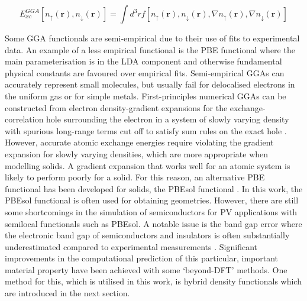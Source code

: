 \documentclass[11pt, twoside]{report}
\begin{document}

\begin{equation}\label{GGA}
E_{xc}^{GGA}[ n_{\uparrow}(\mathbf{r}), n_{\downarrow}(\mathbf{r})] = \int d^3r f [ n_{\uparrow}(\mathbf{r}), n_{\downarrow}(\mathbf{r}), \nabla n_{\uparrow}(\mathbf{r}), \nabla n_{\downarrow}(\mathbf{r})]
\end{equation}

Some GGA functionals are semi-empirical due to their use of fits to experimental data. An example of a less empirical functional is the PBE functional \cite{PBE} where the main parameterisation is in the LDA component and otherwise fundamental physical constants are favoured over empirical fits.
Semi-empirical GGAs can accurately represent small molecules, but usually fail for delocalised electrons in the uniform gas or for simple metals. First-principles numerical GGAs can be constructed from electron density-gradient expansions for the exchange-correlation hole surrounding the electron in a system of slowly varying density with spurious long-range terms cut off to satisfy sum rules on the exact hole \cite{PBE}.
However, accurate atomic exchange energies require violating the gradient expansion for slowly varying densities, which are more appropriate when modelling solids. A gradient expansion that works well for an atomic system is likely to perform poorly for a solid. For this reason, an alternative PBE functional has been developed for solids, the PBEsol functional \cite{PBEsol}. In this work, the PBEsol functional is often used for obtaining geometries. However, there are still some shortcomings in the simulation of semiconductors for PV applications with semilocal functionals such as PBEsol. A notable issue is the band gap error where the electronic band gap of semiconductors and insulators is often substantially underestimated compared to experimental measurements \cite{band_gap_error}. Significant improvements in the computational prediction of this particular, important material property have been achieved with some `beyond-DFT' methods. One method for this, which is utilised in this work, is hybrid density functionals which are introduced in the next section.

\end{document}
